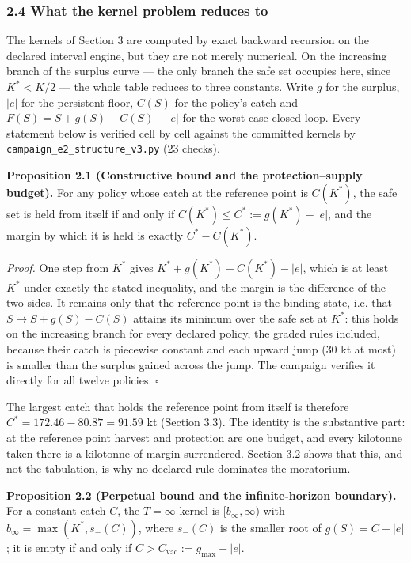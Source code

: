 \subsubsection{2.4 What the kernel problem reduces
to}\label{budget-what-the-kernel-problem-reduces-to}

The kernels of Section 3 are computed by exact backward recursion on the
declared interval engine, but they are not merely numerical. On the increasing
branch of the surplus curve --- the only branch the safe set occupies here,
since \(K^* < K/2\) --- the whole table reduces to three constants. Write
\(g\) for the surplus, \(|e|\) for the persistent floor, \(C(S)\) for the
policy's catch and \(F(S) = S + g(S) - C(S) - |e|\) for the worst-case closed
loop. Every statement below is verified cell by cell against the committed
kernels by \texttt{campaign\_e2\_structure\_v3.py} (23 checks).

\textbf{Proposition 2.1 (Constructive bound and the protection--supply
budget).} For any policy whose catch at the reference point is \(C(K^*)\),
the safe set is held from itself if and only if
\(C(K^*) \le C^* := g(K^*) - |e|\), and the margin by which it is held is
exactly \(C^* - C(K^*)\).

\emph{Proof.} One step from \(K^*\) gives
\(K^* + g(K^*) - C(K^*) - |e|\), which is at least \(K^*\) under exactly the
stated inequality, and the margin is the difference of the two sides. It
remains only that the reference point is the binding state, i.e. that
\(S \mapsto S + g(S) - C(S)\) attains its minimum over the safe set at
\(K^*\): this holds on the increasing branch for every declared policy, the
graded rules included, because their catch is piecewise constant and each
upward jump (\(30\) kt at most) is smaller than the surplus gained across the
jump. The campaign verifies it directly for all twelve policies.
\ensuremath{\square}

The largest catch that holds the reference point from itself is therefore
\(C^* = 172.46 - 80.87 = 91.59\) kt (Section 3.3). The identity is the
substantive part: at the reference point harvest and protection are one
budget, and every kilotonne taken there is a kilotonne of margin surrendered.
Section 3.2 shows that this, and not the tabulation, is why no declared rule
dominates the moratorium.

\textbf{Proposition 2.2 (Perpetual bound and the infinite-horizon
boundary).} For a constant catch \(C\), the \(T=\infty\) kernel is
\([b_\infty, \infty)\) with \(b_\infty = \max(K^*, s_-(C))\), where
\(s_-(C)\) is the smaller root of \(g(S) = C + |e|\); it is empty if and only
if \(C > C_{\mathrm{vac}} := g_{\max} - |e|\).

